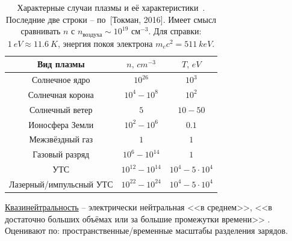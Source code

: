 \documentclass[10pt, a4paper]{article}
\newcommand{\Tokman}{~[Токман, 2016]}
\begin{document}
\begin{table}[ht]
	\caption{Характерные случаи плазмы и её характеристики~\cite{kotelnikov}. \linebreak Последние две строки -- по\Tokman. Имеет смысл сравнивать $n$ с $n_\text{воздуха} \sim 10^{19}$ см$^{-3}$.	Для справки: $1\ eV \approx 11.6\ K$, энергия покоя электрона $m_e c^2 = 511\ keV$.}
	\label{tabular:typical_plasma}
	\begin{center}
		\begin{tabular}{|c|c|c|}
			\hline
			Вид плазмы & $n,\,cm^{-3}$ & $T,\,eV$ \\ \hline
			Солнечное ядро & $10^{26}$ & $10^3$ \\
			Солнечная корона & $10^4-10^8$ & $10^2$ \\
			Солнечный ветер & $5$ & $10-50$ \\
			Ионосфера Земли & $10^2-10^6$ & $0.1$ \\
			Межзвёздный газ & $1$ & $1$ \\
			Газовый разряд & $10^{6}-10^{14}$ & $1$ \\
			УТС & $10^{12}-10^{14}$ & $10^4-5\cdot10^4$ \\
			Лазерный/импульсный УТС & $10^{22}-10^{24}$ & $10^4-5\cdot10^4$ \\
			\hline
		\end{tabular}
	\end{center}
\end{table}

\uline{Квазинейтральность} -- электрически нейтральная <<в среднем>>, <<в достаточно больших объёмах или за большие промежутки времени>> \cite{frank}. Оценивают по: пространственные/временные масштабы разделения зарядов.
\end{document}
